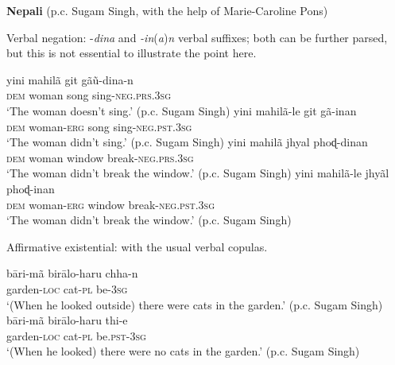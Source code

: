 ﻿\documentclass[output=paper]{langsci/langscibook}
\begin{document}
\begin{unindented}
\textbf{Nepali} (p.c. Sugam Singh, with the help of Marie-Caroline Pons)

Verbal negation: -\textit{dina} and \textit{-in}(\textit{a})\textit{n} verbal suffixes; both can be further parsed, but this is not essential to illustrate the point here.
%
\begin{exe}\ex \gll yini mahilã git gãũ-dina-n \\
\textsc{dem}   woman song sing-\textsc{neg.prs.3sg} \\
    \glt `The woman doesn't sing.' (p.c. Sugam Singh)
\ex \gll yini mahilã-le git gã-inan \\
\textsc{dem} woman-\textsc{erg} song sing-\textsc{neg.pst.3sg} \\
    \glt `The woman didn't sing.' (p.c. Sugam Singh)
\ex \gll yini mahilã jhyal phoɖ-dinan \\
\textsc{dem} woman window break-\textsc{neg.prs.3sg} \\
    \glt `The woman didn't break the window.' (p.c. Sugam Singh)
\ex \gll yini mahilã-le jhyãl phoɖ-inan \\
\textsc{dem}   woman-\textsc{erg}  window break-\textsc{neg.pst.3sg} \\
    \glt `The woman didn't break the window.' (p.c. Sugam Singh)
\end{exe}

Affirmative existential: with the usual verbal copulas. 
%
\begin{exe}\ex \gll bāri-mã birālo-haru chha-n \\
garden-\textsc{loc} cat-\textsc{pl} be-\textsc{3sg} \\
    \glt `(When he looked outside) there were cats in the garden.' (p.c. Sugam Singh)
\ex \gll bāri-mã birālo-haru thi-e \\
garden-\textsc{loc} cat-\textsc{pl} be.\textsc{pst-3sg} \\
    \glt `(When he looked) there were no cats in the garden.' (p.c. Sugam Singh)
    \end{exe}


\end{unindented}
\end{document}
